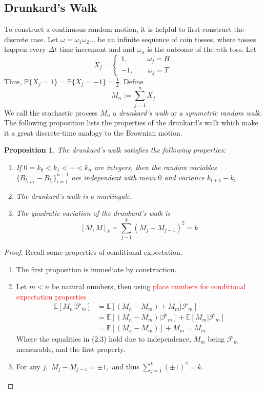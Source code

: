 \documentclass[openany, amssymb, psamsfonts]{amsart}
\newtheorem{prop}{Proposition}[section]
\theoremstyle{definition}
\numberwithin{equation}{section}
\newcommand{\bbE}{\mathbb{E}}
\newcommand{\bbP}{\mathbb{P}}
\begin{document}
\subsection{Drunkard's Walk} %

To construct a continuous random motion, it is helpful to first construct the discrete case.\newline
Let $\omega = \omega_1\omega_2\dots$ be an infinite sequence of coin tosses, where tosses happen every $\Delta t$ time increment and and $\omega_n$ is the outcome of the $n$th toss. Let
\[X_j = \begin{cases}
1, \qquad \:\:\;\omega_j = H\\
-1, \qquad \omega_j = T
\end{cases}\]
Thus, $\bbP\{X_j = 1\} = \bbP\{X_j = -1\} = \frac{1}{2}.$ Define
\[M_n:= \sum_{j=1}^nX_j\] We call the stochastic process $M_n$ a \textit{drunkard's walk} or a \textit{symmetric random walk.}\newline
The following proposition lists the properties of the drunkard's walk which make it a great discrete-time analogy to the Brownian motion.

\begin{prop}
The drunkard's walk satisfies the following properties:
\begin{enumerate}
\item If $0 = k_0 < k_1 < \cdots < k_n$ are integers, then the random variables $\{B_{t_{i+1}} - B_{t_i}\}_{i=1}^{n-1}$ are independent with mean $0$ and variance $k_{i+1} - k_i.$
\item The drunkard's walk is a martingale.
\item The quadratic variation of the drunkard's walk is 
\[[M,M]_k = \sum_{j-1}^k(M_j - M_{j-1})^2 = k\]
\end{enumerate}
\end{prop}

\begin{proof} Recall some properties of conditional expectation.
\begin{enumerate}
    \item The first proposition is immediate by construction.
    \item Let $m<n$ be natural numbers, then using \textcolor{red}{place numbers for conditional expectation properties}
        \begin{align}
            \bbE[M_n | \mathcal{F}_m] &= \bbE[(M_n - M_m) + M_m | \mathcal{F}_m] \nonumber\\
            &= \bbE[(M_n - M_m)| \mathcal{F}_m] + \bbE[M_m | \mathcal{F}_m]\nonumber\\
            &= \bbE[(M_n - M_m)] + M_m = M_m
        \end{align}
        Where the equalities in (2.3) hold due to independence, $M_m$ being $\mathcal{F}_m$ measurable, and the first property.
    \item For any $j,$ $M_j - M_{j-1} = \pm 1,$ and thus $\displaystyle\sum_{j=1}^k (\pm 1)^2 = k.$
\end{enumerate}
\end{proof}
\end{document}
